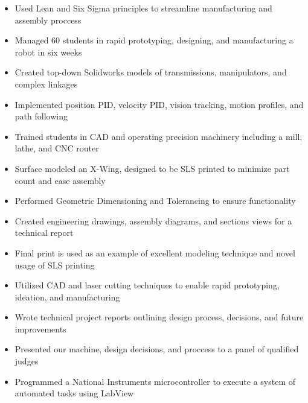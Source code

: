 \documentclass{resume}
\begin{document}
\begin{itemize}
  \item Used Lean and Six Sigma principles to streamline manufacturing and assembly proccess
  \item Managed 60 students in rapid prototyping, designing, and manufacturing a robot in six weeks
  \item Created top-down Solidworks models of transmissions, manipulators, and complex linkages
  \item Implemented position PID, velocity PID, vision tracking, motion profiles, and path following
  \item Trained students in CAD and operating precision machinery including a mill, lathe, and CNC router
\end{itemize}

\begin{itemize}
  \item Surface modeled an X-Wing, designed to be SLS printed to minimize part count and ease assembly
  \item Performed Geometric Dimensioning and Tolerancing to ensure functionality
  \item Created engineering drawings, assembly diagrams, and sections views for a technical report
  \item Final print is used as an example of excellent modeling technique and novel usage of SLS printing
\end{itemize}

\begin{itemize}
  \item Utilized CAD and laser cutting techniques to enable rapid prototyping, ideation, and manufacturing
  \item Wrote technical project reports outlining design process, decisions, and future improvements
  \item Presented our machine, design decisions, and proccess to a panel of qualified judges
  \item Programmed a National Instruments microcontroller to execute a system of automated tasks using LabView
\end{itemize}
\end{document}
